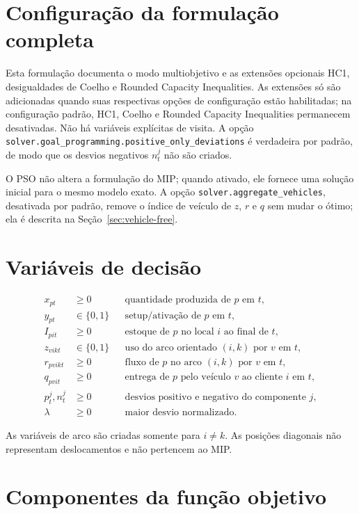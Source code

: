 \documentclass[11pt,a4paper]{article}
\begin{document}
\section{Configuração da formulação completa}

Esta formulação documenta o modo multiobjetivo e as extensões opcionais HC1,
desigualdades de Coelho e Rounded Capacity Inequalities. As extensões só são
adicionadas quando suas respectivas opções de configuração estão habilitadas;
na configuração padrão, HC1, Coelho e Rounded Capacity Inequalities permanecem
desativadas. Não há variáveis explícitas de visita. A opção
\texttt{solver.goal\_programming.positive\_only\_deviations} é verdadeira por
padrão, de modo que os desvios negativos $n_t^j$ não são criados.

O PSO não altera a formulação do MIP; quando ativado, ele fornece uma solução
inicial para o mesmo modelo exato.
A opção \texttt{solver.aggregate\_vehicles}, desativada por padrão, remove o
índice de veículo de $z$, $r$ e $q$ sem mudar o ótimo; ela é descrita na
Seção~\ref{sec:vehicle-free}.

\section{Variáveis de decisão}

\begin{align*}
  x_{pt} &\ge 0 &&\text{quantidade produzida de $p$ em $t$},\\
  y_{pt} &\in\{0,1\} &&\text{setup/ativação de $p$ em $t$},\\
  I_{pit} &\ge 0 &&\text{estoque de $p$ no local $i$ ao final de $t$},\\
  z_{vikt} &\in\{0,1\} &&\text{uso do arco orientado $(i,k)$ por $v$ em $t$},\\
  r_{pvikt} &\ge 0 &&\text{fluxo de $p$ no arco $(i,k)$ por $v$ em $t$},\\
  q_{pvit} &\ge 0 &&\text{entrega de $p$ pelo veículo $v$ ao cliente $i$ em $t$},\\
  p_t^j,n_t^j &\ge 0 &&\text{desvios positivo e negativo do componente $j$},\\
  \lambda &\ge 0 &&\text{maior desvio normalizado}.
\end{align*}

As variáveis de arco são criadas somente para $i\ne k$. As posições diagonais
não representam deslocamentos e não pertencem ao MIP.

\section{Componentes da função objetivo}
\end{document}
